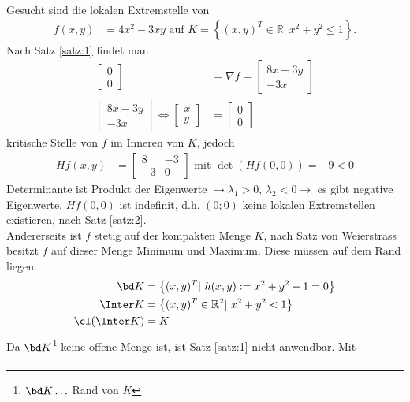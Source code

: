 \begin{exmp}
Gesucht sind die lokalen Extremstelle von 
\begin{align*}
	f(x,y) & = 4x^2-3xy \text{ auf } K=\left\{(x,y)^T\in\mathbb{R}|\ x^2+y^2\le 1 \right\}.
\end{align*}
Nach Satz \ref{satz:1} findet man 
\begin{align*}
	\begin{bmatrix}
	0\\0
	\end{bmatrix} & = \nabla f = \begin{bmatrix}
	8x-3y\\-3x
	\end{bmatrix}\\
	\begin{bmatrix}
	8x-3y\\-3x
	\end{bmatrix}\Leftrightarrow \begin{bmatrix}
	x\\y
	\end{bmatrix} & = \begin{bmatrix}
	0\\0
	\end{bmatrix}
\end{align*}
kritische Stelle von $f$ im Inneren von $K$, jedoch
\begin{align*}
		H f(x,y) & = \begin{bmatrix}
		8 & -3\\ -3 & 0
		\end{bmatrix} \text{ mit } \det\left(H f(0,0)\right) = -9 < 0
\end{align*}
Determinante ist Produkt der Eigenwerte $\rightarrow \lambda_1>0$, $\lambda_2<0\rightarrow$ es gibt negative Eigenwerte. $H f(0,0)$ ist indefinit, d.h. $(0;0)$ keine lokalen Extremstellen
existieren, nach Satz \ref{satz:2}.\\ 
Andererseits ist $f$ stetig auf der kompakten Menge $K$, nach Satz von Weierstrass besitzt $f$ auf dieser Menge Minimum und Maximum. Diese müssen
auf dem Rand liegen.
\begin{align*}
	\bd K  & = \left\{(x,y)^T|\ h(x,y):=x^2+y^2-1=0\right\}\\
	\Inter K &=\left\{(x,y)^T\in\mathbb{R}^2|\ x^2+y^2<1 \right\}\\
	\cl(\Inter K) & = K
\end{align*}
Da $\bd K$\footnote{$\bd K\ldots$ Rand von $K$} keine offene Menge ist, ist Satz \ref{satz:1} nicht anwendbar. Mit
\begin{align*}

\end{align*}
\end{exmp}
